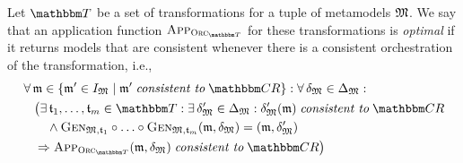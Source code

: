 \begin{definition}
    \label{def:optimalapplicationfunction}
    Let $\transformationset{T}$ be a set of transformations for a tuple of metamodels $\metamodeltuple{M} %
    $.
    We say that an application function $\appfunction{\orcfunction{\transformationset{T}}}$ for these transformations is \emph{optimal} if it returns models that are consistent whenever there is a consistent orchestration of the transformation, i.e.,
    \begin{align*}
        &
        \forall \modeltuple{m} \in \setted{\modeltuple{m}' \in \metamodeltupleinstanceset{M} \mid \modeltuple{m}' \consistenttomath \consistencyrelationset{CR}} : \forall \changetuple{\metamodeltuple{M}} %
        \in \changeuniverse{\metamodeltuple{M}} : \\
        & \formulaskip
        \bigl(
            \exists \transformation{t}_{1}, \dots, \transformation{t}_{m} \in \transformationset{T} : 
            \exists \changetuple{\metamodeltuple{M}}' %
            \in \changeuniverse{\metamodeltuple{M}} : \changetuple{\metamodeltuple{M}}'(\modeltuple{m}) \consistenttomath \consistencyrelationset{CR}\\
            & \formulaskip \formulaskip
            \land \generalizationfunction{\metamodeltuple{M}, \transformation{t}_{1}} \concatfunction \dots \concatfunction \generalizationfunction{\metamodeltuple{M}, \transformation{t}_{m}}(\modeltuple{m}, \changetuple{\metamodeltuple{M}}) = (\modeltuple{m}, \changetuple{\metamodeltuple{M}}') %
            \\
            & \formulaskip
            \Rightarrow \appfunction{\orcfunction{\transformationset{T}}}(\modeltuple{m},\changetuple{\metamodeltuple{M}}) \consistenttomath \consistencyrelationset{CR}
        \bigr)
    \end{align*}
\end{definition}

